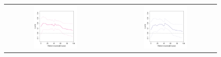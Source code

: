 \documentclass[aos]{imsart}
\theoremstyle{plain}
\theoremstyle{definition}
\theoremstyle{remark}
\newcommand{\FIGW}{0.45}
\begin{document}
\begin{CJK}{UTF8}{gbsn}
\begin{figure}
\centering
\begin{tabular}{ccc}
\includegraphics[width=\FIGW\textwidth]{familysize_18.pdf} & &
\includegraphics[width=\FIGW\textwidth]{familysize_22.pdf} \\

\end{tabular}
\end{figure}
\end{CJK}
\end{document}
